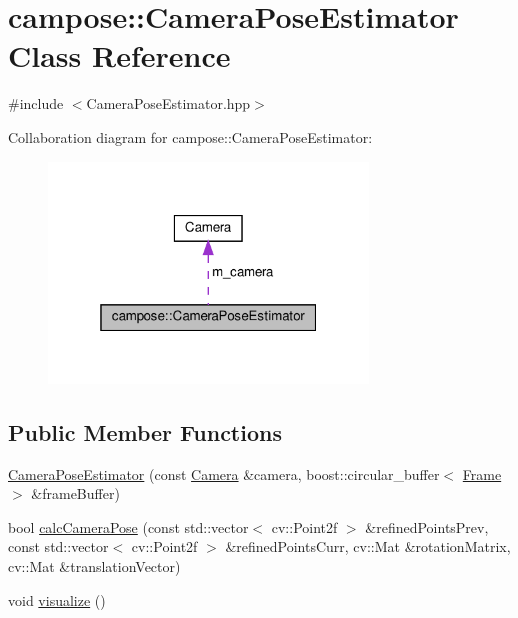 \hypertarget{classcampose_1_1CameraPoseEstimator}{}\section{campose\+:\+:Camera\+Pose\+Estimator Class Reference}
\label{classcampose_1_1CameraPoseEstimator}


{\ttfamily \#include $<$Camera\+Pose\+Estimator.\+hpp$>$}



Collaboration diagram for campose\+:\+:Camera\+Pose\+Estimator\+:
\nopagebreak
\begin{figure}[H]
\begin{center}
\leavevmode
\includegraphics[width=241pt]{classcampose_1_1CameraPoseEstimator__coll__graph}
\end{center}
\end{figure}
\subsection*{Public Member Functions}
\begin{DoxyCompactItemize}
\item 
\hyperlink{classcampose_1_1CameraPoseEstimator_ac2e15d64ea58fbb2fe08b575a599a280}{Camera\+Pose\+Estimator} (const \hyperlink{classCamera}{Camera} \&camera, boost\+::circular\+\_\+buffer$<$ \hyperlink{classFrame}{Frame} $>$ \&frame\+Buffer)
\item 
bool \hyperlink{classcampose_1_1CameraPoseEstimator_a975c193e745e9150f0726e188a2daa1e}{calc\+Camera\+Pose} (const std\+::vector$<$ cv\+::\+Point2f $>$ \&refined\+Points\+Prev, const std\+::vector$<$ cv\+::\+Point2f $>$ \&refined\+Points\+Curr, cv\+::\+Mat \&rotation\+Matrix, cv\+::\+Mat \&translation\+Vector)
\item 
void \hyperlink{classcampose_1_1CameraPoseEstimator_ac1b95d78d7d3f4c8032d8e494034420c}{visualize} ()
\end{DoxyCompactItemize}
